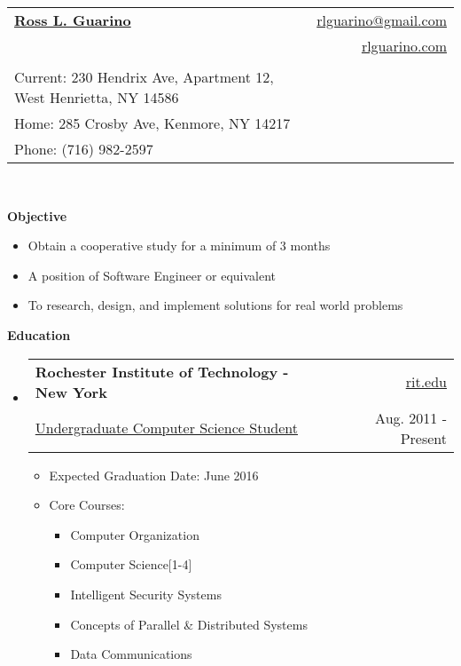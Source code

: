 \documentclass[letterpaper,11pt]{article}
\makeatletter
\newcommand{\resheading}[1]{{\large \colorbox{mygrey}{\begin{minipage}{\textwidth}{\textbf{#1 \vphantom{p\^{E}}}}\end{minipage}}}}
\newcommand{\ressubheading}[4]{
\begin{tabular*}{6.5in}{l@{\extracolsep{\fill}}r}
		\textbf{#1} & #2 \\
		{#3} & {#4} \\
\end{tabular*}\vspace{-6pt}}
\makeatother
\begin{document}
 

\thispagestyle{empty}
\pagestyle{empty}

\newcommand{\mywebheader}{
\begin{tabular*}{7in}{l@{\extracolsep{\fill}}r} \\
	\textbf{\href{http://www.rlguarino.com/}{\large Ross L. Guarino}} & \href{mailto:rlguarino@gmail.com}{rlguarino@gmail.com}\\ &
	\href{http://rlguarino.com/}{rlguarino.com} \\ \vspace{-10mm} \\
	{\footnotesize {{Current: 230 Hendrix Ave, Apartment 12,
West Henrietta, NY 14586}}} & \\
	{\footnotesize {{Home: 285 Crosby Ave, Kenmore, NY 14217}}} & \\
	{\footnotesize {{Phone: (716) 982-2597}}} 	\end{tabular*}
\\
\vspace{0.1in}}

\mywebheader

\resheading{Objective}
{
	\footnotesize
	\begin{itemize}
		\item{Obtain a cooperative study for a minimum of 3 months}
		\item{A position of Software Engineer or equivalent}
		\item{To research, design, and implement solutions for real world problems}
	\end{itemize}
}
\resheading{Education}
	{ \footnotesize
	\begin{itemize}
		\item
			\ressubheading{Rochester Institute of Technology - New York}{\href{http://www.rit.edu}{rit.edu}}{\href{http://www.cs.rit.edu/}{Undergraduate Computer Science Student}}{Aug. 2011 - Present}
				{ \footnotesize
				\begin{itemize}
					\item{Expected Graduation Date: June 2016}
					\item{Core Courses:}
						\begin{itemize}
							\item{Computer Organization}
							\item{Computer Science[1-4]}
                                                        \item{Intelligent Security Systems}
							\item{Concepts of Parallel \& Distributed Systems}
							\item{Data Communications}
						\end{itemize}
				\end{itemize}
				}
	\end{itemize} %
	}
\end{document}
